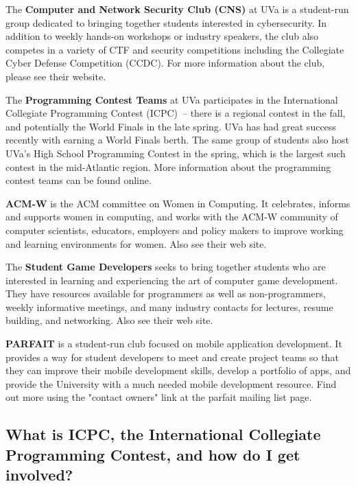 The {\bf Computer and Network Security Club (CNS)} at UVa is a 
student-run group dedicated to bringing together students interested 
in cybersecurity. In addition to weekly hands-on workshops or industry 
speakers, the club also competes in a variety of CTF and security 
competitions including the Collegiate Cyber Defense Competition (CCDC). 
For more information about the club, please see their 
website.   

The {\bf Programming Contest Teams} at UVa participates in the
International Collegiate Programming Contest (ICPC)~-- there is a
regional contest in the fall, and potentially the World Finals in the
late spring.  UVa has had great success recently with earning a World
Finals berth.  The same group of students also host UVa's High School
Programming Contest in the spring, which is the largest such contest
in the mid-Atlantic region.  More information about the programming
contest teams can be found
online.

{\bf ACM-W} is the ACM committee on Women in Computing. It celebrates,
informs and supports women in computing, and works with the ACM-W
community of computer scientists, educators, employers and policy
makers to improve working and learning environments for women. Also
see their web site.

The {\bf Student Game Developers} seeks to bring together students who
are interested in learning and experiencing the art of computer game
development. They have resources available for programmers as well as
non-programmers, weekly informative meetings, and many industry
contacts for lectures, resume building, and networking. Also see their
web site.

{\bf PARFAIT} is a student-run club focused on mobile application
development. It provides a way for student developers to meet and
create project teams so that they can improve their mobile development
skills, develop a portfolio of apps, and provide the University with a
much needed mobile development resource. Find out more using the "contact
owners" link at the parfait mailing list
page.

\subsection{What is ICPC, the International Collegiate Programming
  Contest, and how do I get involved?}

